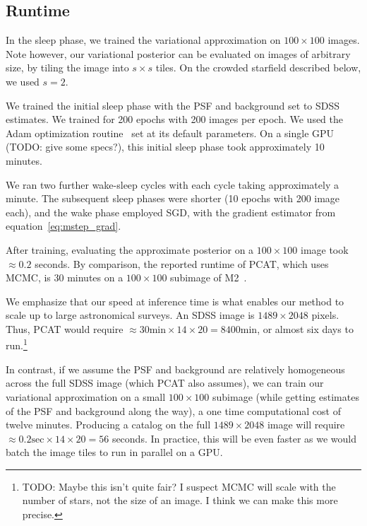 \subsection{Runtime} 
\label{sec:runtime}
In the sleep phase, we trained the variational approximation on 
$100 \times 100$ images. Note however, our variational posterior can be evaluated on images of arbitrary size, by tiling the image into $s \times s$ tiles. On the crowded starfield described below, we used $s = 2$. 

We trained the initial sleep phase with the PSF and background set to SDSS estimates. We trained for 200 epochs with 200 images per epoch. We used 
the Adam optimization routine~\cite{kingma2014adam} set at its default parameters. On a single GPU (TODO: give some specs?),
this initial sleep phase took approximately 10 minutes. 

We ran two further wake-sleep cycles with each cycle taking approximately a minute. The subsequent sleep phases were shorter (10 epochs with 200 image each), and the wake phase employed SGD, with the gradient estimator from equation~\eqref{eq:mstep_grad}. 

After training, evaluating the approximate posterior on a $100 \times 100$ 
image took $\approx 0.2$ seconds. By comparison, the reported runtime of PCAT, which uses MCMC, is 30 minutes on a $100 \times 100$ subimage of M2~\cite{Feder_2019}. 

We emphasize that our speed at inference time is what enables our method to 
scale up to large astronomical surveys. An SDSS image is $1489 \times 2048$ 
pixels. Thus, PCAT would require 
$\approx 30\text{min} \times 14 \times 20 = 8400$min, or almost six days to run.\footnote{TODO: 
Maybe this isn't quite fair? I suspect MCMC will scale
with the number of stars, not the size of an image. I think we can make 
this more precise.}

In contrast, if we assume the PSF and background are relatively homogeneous 
across the full SDSS image (which PCAT also assumes), we can 
train our variational approximation on a small $100 \times 100$ subimage
(while getting estimates of the PSF and background along the way),
a one time computational cost of twelve minutes. 
Producing a catalog on the full $1489 \times 2048$ image will require 
$\approx 0.2\text{sec} \times 14 \times 20 = 56$ seconds. In practice, 
this will be even faster as we would batch the image tiles to run in parallel on a GPU. 

